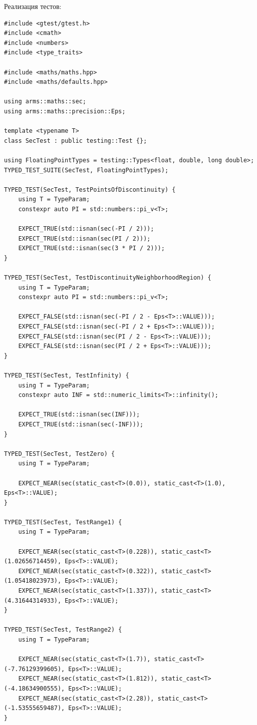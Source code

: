 \documentclass[12pt,a4paper]{report}
\begin{document}
Реализация тестов:
\begin{verbatim}
#include <gtest/gtest.h>
#include <cmath>
#include <numbers>
#include <type_traits>

#include <maths/maths.hpp>
#include <maths/defaults.hpp>

using arms::maths::sec;
using arms::maths::precision::Eps;

template <typename T>
class SecTest : public testing::Test {};

using FloatingPointTypes = testing::Types<float, double, long double>;
TYPED_TEST_SUITE(SecTest, FloatingPointTypes);

TYPED_TEST(SecTest, TestPointsOfDiscontinuity) {
    using T = TypeParam;
    constexpr auto PI = std::numbers::pi_v<T>;

    EXPECT_TRUE(std::isnan(sec(-PI / 2)));
    EXPECT_TRUE(std::isnan(sec(PI / 2)));
    EXPECT_TRUE(std::isnan(sec(3 * PI / 2)));
}

TYPED_TEST(SecTest, TestDiscontinuityNeighborhoodRegion) {
    using T = TypeParam;
    constexpr auto PI = std::numbers::pi_v<T>;

    EXPECT_FALSE(std::isnan(sec(-PI / 2 - Eps<T>::VALUE)));
    EXPECT_FALSE(std::isnan(sec(-PI / 2 + Eps<T>::VALUE)));
    EXPECT_FALSE(std::isnan(sec(PI / 2 - Eps<T>::VALUE)));
    EXPECT_FALSE(std::isnan(sec(PI / 2 + Eps<T>::VALUE)));
}

TYPED_TEST(SecTest, TestInfinity) {
    using T = TypeParam;
    constexpr auto INF = std::numeric_limits<T>::infinity();

    EXPECT_TRUE(std::isnan(sec(INF)));
    EXPECT_TRUE(std::isnan(sec(-INF)));
}

TYPED_TEST(SecTest, TestZero) {
    using T = TypeParam;

    EXPECT_NEAR(sec(static_cast<T>(0.0)), static_cast<T>(1.0), Eps<T>::VALUE);
}

TYPED_TEST(SecTest, TestRange1) {
    using T = TypeParam;

    EXPECT_NEAR(sec(static_cast<T>(0.228)), static_cast<T>(1.02656714459), Eps<T>::VALUE);
    EXPECT_NEAR(sec(static_cast<T>(0.322)), static_cast<T>(1.05418023973), Eps<T>::VALUE);
    EXPECT_NEAR(sec(static_cast<T>(1.337)), static_cast<T>(4.31644314933), Eps<T>::VALUE);
}

TYPED_TEST(SecTest, TestRange2) {
    using T = TypeParam;

    EXPECT_NEAR(sec(static_cast<T>(1.7)), static_cast<T>(-7.76129399605), Eps<T>::VALUE);
    EXPECT_NEAR(sec(static_cast<T>(1.812)), static_cast<T>(-4.18634900555), Eps<T>::VALUE);
    EXPECT_NEAR(sec(static_cast<T>(2.28)), static_cast<T>(-1.53555659487), Eps<T>::VALUE);
}


\end{verbatim}
\end{document}
